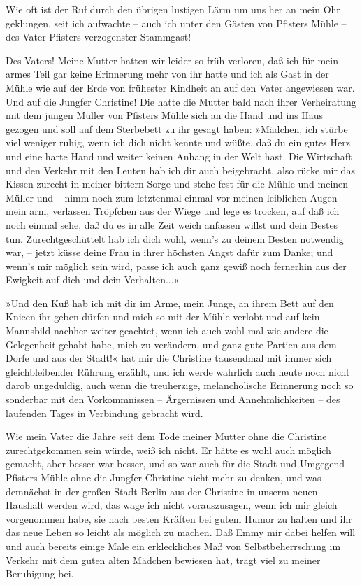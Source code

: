 Wie oft ist der Ruf durch den übrigen lustigen Lärm um uns her an
mein Ohr geklungen, seit ich aufwachte – auch ich unter den Gästen
von Pfisters Mühle – des Vater Pfisters verzogenster Stammgast!

Des Vaters! Meine Mutter hatten wir leider so früh verloren, daß
ich für mein armes Teil gar keine Erinnerung mehr von ihr hatte und
ich als Gast in der Mühle wie auf der Erde von frühester Kindheit
an auf den Vater angewiesen war. Und auf die Jungfer Christine! Die
hatte die Mutter bald nach ihrer Verheiratung mit dem jungen Müller
von Pfisters Mühle sich an die Hand und ins Haus gezogen und soll
auf dem Sterbebett zu ihr gesagt haben: »Mädchen, ich stürbe viel
weniger ruhig, wenn ich dich nicht kennte und wüßte, daß du ein
gutes Herz und eine harte Hand und weiter keinen Anhang in der Welt
hast. Die Wirtschaft und den Verkehr mit den Leuten hab ich dir
auch beigebracht, also rücke mir das Kissen zurecht in meiner
bittern Sorge und stehe fest für die Mühle und meinen Müller und –
nimm noch zum letztenmal einmal vor meinen leiblichen Augen mein
arm, verlassen Tröpfchen aus der Wiege und lege es trocken, auf daß
ich noch einmal sehe, daß du es in alle Zeit weich anfassen willst
und dein Bestes tun. Zurechtgeschüttelt hab ich dich wohl, wenn's
zu deinem Besten notwendig war, – jetzt küsse deine Frau in ihrer
höchsten Angst dafür zum Danke; und wenn's mir möglich sein wird,
passe ich auch ganz gewiß noch fernerhin aus der Ewigkeit auf dich
und dein Verhalten...«

»Und den Kuß hab ich mit dir im Arme, mein Junge, an ihrem Bett auf
den Knieen ihr geben dürfen und mich so mit der Mühle verlobt und
auf kein Mannsbild nachher weiter geachtet, wenn ich auch wohl mal
wie andere die Gelegenheit gehabt habe, mich zu verändern, und ganz
gute Partien aus dem Dorfe und aus der Stadt!« hat mir die
Christine tausendmal mit immer sich gleichbleibender Rührung
erzählt, und ich werde wahrlich auch heute noch nicht darob
ungeduldig, auch wenn die treuherzige, melancholische Erinnerung
noch so sonderbar mit den Vorkommnissen – Ärgernissen und
Annehmlichkeiten – des laufenden Tages in Verbindung gebracht
wird.

Wie mein Vater die Jahre seit dem Tode meiner Mutter ohne die
Christine zurechtgekommen sein würde, weiß ich nicht. Er hätte es
wohl auch möglich gemacht, aber besser war besser, und so war auch
für die Stadt und Umgegend Pfisters Mühle ohne die Jungfer
Christine nicht mehr zu denken, und was demnächst in der großen
Stadt Berlin aus der Christine in unserm neuen Haushalt werden
wird, das wage ich nicht vorauszusagen, wenn ich mir gleich
vorgenommen habe, sie nach besten Kräften bei gutem Humor zu halten
und ihr das neue Leben so leicht als möglich zu machen. Daß Emmy
mir dabei helfen will und auch bereits einige Male ein
erkleckliches Maß von Selbstbeherrschung im Verkehr mit dem guten
alten Mädchen bewiesen hat, trägt viel zu meiner Beruhigung
bei.~–~–

